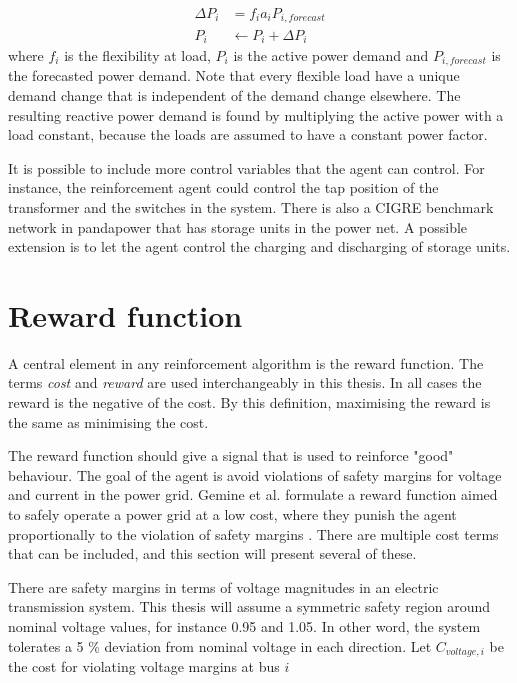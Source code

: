 \documentclass[class=book, crop=false]{standalone}
\begin{document}
\begin{equation}
   \begin{aligned}
   \label{eq:problem:update_demand}
    \Delta P_{i}& = f_{i}a_{i}P_{i,forecast} \\
    P_{i}& \leftarrow P_{i} + \Delta P_{i}
    \end{aligned} 
\end{equation}
where $f_{i}$ is the flexibility at load, $P_{i}$ is the active power demand and $P_{i,forecast}$ is the forecasted power demand. Note that every flexible load have a unique demand change that is independent of the demand change elsewhere. The resulting reactive power demand is found by multiplying the active power with a load constant, because the loads are assumed to have a constant power factor.

It is possible to include more control variables that the agent can control. For instance, the reinforcement agent could control the tap position of the transformer and the switches in the system. There is also a CIGRE benchmark network in pandapower that has storage units in the power net. A possible extension is to let the agent control the charging and discharging of storage units.

\section{Reward function}\label{section:reward}
A central element in any reinforcement algorithm is the reward function. The terms \textit{cost} and \textit{reward} are used interchangeably in this thesis. In all cases the reward is the negative of the cost. By this definition, maximising the reward is the same as minimising the cost. 

The reward function should give a signal that is used to reinforce "good" behaviour. The goal of the agent is avoid violations of safety margins for voltage and current in the power grid. Gemine et al. formulate a reward function aimed to safely operate a power grid at a low cost, where they punish the agent proportionally to the violation of safety margins \cite{active_network_management}. There are multiple cost terms that can be included, and this section will present several of these. 

There are safety margins in terms of voltage magnitudes in an electric transmission system. 
This thesis will assume a symmetric safety region around nominal voltage values, for instance 0.95 and 1.05. In other word, the system tolerates a 5 \% deviation from nominal voltage in each direction. Let $C_{voltage,i}$ be the cost for violating voltage margins at bus $i$
\end{document}
